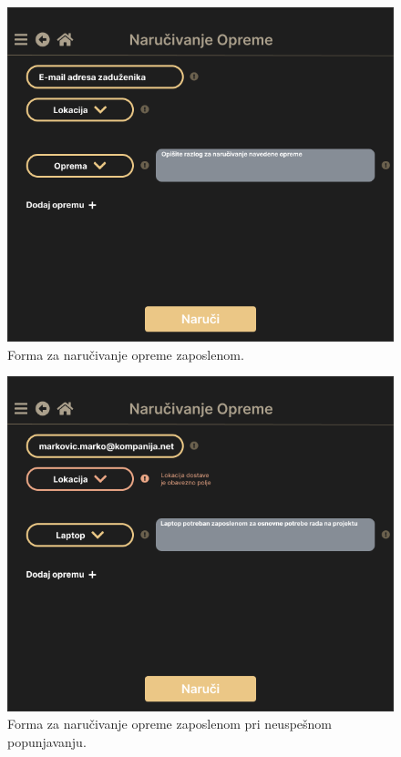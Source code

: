 \documentclass[a4paper]{article}
\begin{document}
\begin{figure} [!ht]
    \begin{center}
        \includegraphics[scale=0.33]{UI/Administrator/Administrator_NarucivanjeOpreme_Forma.png}
    \end{center}
\caption{Forma za naručivanje opreme zaposlenom.}
\end{figure}

\begin{figure} [!ht]
    \begin{center}
        \includegraphics[scale=0.33]{UI/Administrator/Administrator_NarucivanjeOpreme_ObaveznoPolje.png}
    \end{center}
\caption{Forma za naručivanje opreme zaposlenom pri neuspešnom popunjavanju.}
\end{figure}
\end{document}
